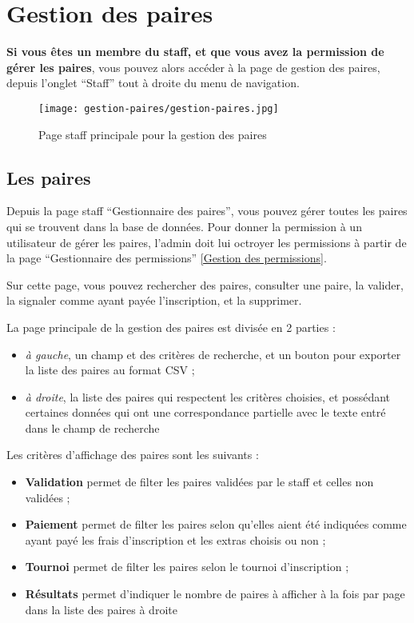 \section{Gestion des paires}

\textbf{Si vous êtes un membre du staff, et que vous avez la permission de gérer les paires}, vous pouvez alors accéder à la page de gestion des paires, depuis l'onglet \enquote{Staff} tout à droite du menu de navigation.

\begin{figure}[H]
\centering
\texttt{[image: gestion-paires/gestion-paires.jpg]}
\caption{Page staff principale pour la gestion des paires}
\end{figure}

\subsection{Les paires}

Depuis la page staff \enquote{Gestionnaire des paires}, vous pouvez gérer toutes les paires qui se trouvent dans la base de données. Pour donner la permission à un utilisateur de gérer les paires, l'admin doit lui octroyer les permissions à partir de la page \enquote{Gestionnaire des permissions} \ref{Gestion des permissions}.\newline

Sur cette page, vous pouvez rechercher des paires, consulter une paire, la valider, la signaler comme ayant payée l'inscription, et la supprimer.\newline

La page principale de la gestion des paires est divisée en 2 parties :

\begin{itemize}
\item \textit{à gauche}, un champ et des critères de recherche, et un bouton pour exporter la liste des paires au format CSV ;
\item \textit{à droite}, la liste des paires qui respectent les critères choisies, et possédant certaines données qui ont une correspondance partielle avec le texte entré dans le champ de recherche
\end{itemize}
\bigskip

Les critères d'affichage des paires sont les suivants :

\begin{itemize}
\item \textbf{Validation} permet de filter les paires validées par le staff et celles non validées ;
\item \textbf{Paiement} permet de filter les paires selon qu'elles aient été indiquées comme ayant payé les frais d'inscription et les extras choisis ou non ;
\item \textbf{Tournoi} permet de filter les paires selon le tournoi d'inscription ;
\item \textbf{Résultats} permet d'indiquer le nombre de paires à afficher à la fois par page dans la liste des paires à droite
\end{itemize}
\bigskip

